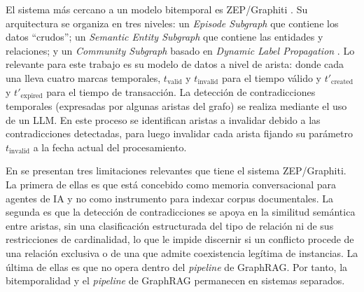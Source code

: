 El sistema más cercano a un modelo bitemporal es ZEP/Graphiti \cite{zep2025}. Su arquitectura se organiza en tres niveles: un \emph{Episode Subgraph} que contiene los datos ``crudos''; un \emph{Semantic Entity Subgraph} que contiene las entidades y relaciones; y un \emph{Community Subgraph} basado en \emph{Dynamic Label Propagation} \cite{zhu2002labelpropagation}. Lo relevante para este trabajo es su modelo de datos a nivel de arista: donde cada una lleva cuatro marcas temporales, $t_{\text{valid}}$ y $t_{\text{invalid}}$ para el tiempo válido y $t'_{\text{created}}$ y $t'_{\text{expired}}$ para el tiempo de transacción. La detección de contradicciones temporales (expresadas por algunas aristas del grafo) se realiza mediante el uso de un LLM. En este proceso se identifican aristas a invalidar debido a las contradicciones detectadas, para luego invalidar cada arista fijando su parámetro $t_{\text{invalid}}$ a la fecha actual del procesamiento.

En \cite{zep2025} se presentan tres limitaciones relevantes que tiene el sistema ZEP/Graphiti. La primera de ellas es que está concebido como memoria conversacional para agentes de IA y no como instrumento para indexar corpus documentales. La segunda es que la detección de contradicciones se apoya en la similitud semántica entre aristas, sin una clasificación estructurada del tipo de relación ni de sus restricciones de cardinalidad, lo que le impide discernir si un conflicto procede de una relación exclusiva o de una que admite coexistencia legítima de instancias. La última de ellas es que no opera dentro del \emph{pipeline} de GraphRAG. Por tanto, la bitemporalidad y el \emph{pipeline} de GraphRAG permanecen en sistemas separados.

